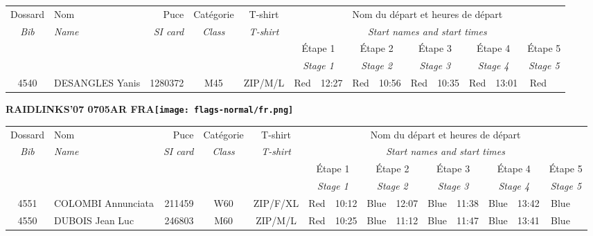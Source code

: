 \documentclass{report}
\begin{document}
  \begin{longtable}{|c|l|r|c|c|*{5}{cc|}}
    Dossard & Nom  & Puce    & Catégorie & T-shirt & \multicolumn{10}{c|}{Nom du départ et heures de départ} \\
    \itshape Bib     & \itshape Name & \itshape SI card & \itshape Class  & \itshape  T-shirt  & \multicolumn{10}{c|}{\itshape Start names and start times} \\
    \hline
    & & & & & \multicolumn{2}{c|}{Étape 1} & \multicolumn{2}{c|}{Étape 2} & \multicolumn{2}{c|}{Étape 3} & \multicolumn{2}{c|}{Étape 4} & \multicolumn{2}{c|}{Étape 5} \\
    & & & & & \multicolumn{2}{c|}{\itshape Stage 1} & \multicolumn{2}{c|}{\itshape Stage 2} & \multicolumn{2}{c|}{\itshape Stage 3} & \multicolumn{2}{c|}{\itshape Stage 4} & \multicolumn{2}{c|}{\itshape Stage 5} \\
    \hline
    4540 & DESANGLES Yanis & 1280372 & M45 & ZIP/M/L & Red & 12:27 & Red & 10:56 & Red & 10:35 & Red & 13:01 & Red &  \\
  \end{longtable}
\newpage
  \Huge \centering \bfseries RAIDLINKS'07 0705AR FRA\normalfont \footnotesize \sffamily \hfill \texttt{[image: flags-normal/fr.png]} \newline 
  \begin{longtable}{|c|l|r|c|c|*{5}{cc|}}
    Dossard & Nom  & Puce    & Catégorie & T-shirt & \multicolumn{10}{c|}{Nom du départ et heures de départ} \\
    \itshape Bib     & \itshape Name & \itshape SI card & \itshape Class  & \itshape  T-shirt  & \multicolumn{10}{c|}{\itshape Start names and start times} \\
    \hline
    & & & & & \multicolumn{2}{c|}{Étape 1} & \multicolumn{2}{c|}{Étape 2} & \multicolumn{2}{c|}{Étape 3} & \multicolumn{2}{c|}{Étape 4} & \multicolumn{2}{c|}{Étape 5} \\
    & & & & & \multicolumn{2}{c|}{\itshape Stage 1} & \multicolumn{2}{c|}{\itshape Stage 2} & \multicolumn{2}{c|}{\itshape Stage 3} & \multicolumn{2}{c|}{\itshape Stage 4} & \multicolumn{2}{c|}{\itshape Stage 5} \\
    \hline
    4551 & COLOMBI Annunciata & 211459 & W60 & ZIP/F/XL & Red & 10:12 & Blue & 12:07 & Blue & 11:38 & Blue & 13:42 & Blue &  \\
    4550 & DUBOIS Jean Luc & 246803 & M60 & ZIP/M/L & Red & 10:25 & Blue & 11:12 & Blue & 11:47 & Blue & 13:41 & Blue &  \\
  \end{longtable}
\end{document}
